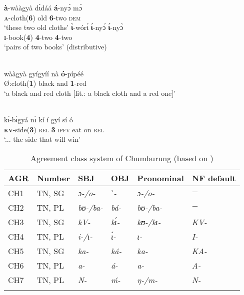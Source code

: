 \documentclass[output=collectionpaper]{langsci/langscibook}
\begin{document}
\ea
\label{ex:Gueld:7}
\begin{xlist}
\ex
\gll \textbf{à}{}-wààgyà   d\`{ɩ}dáá   \textbf{á}{}-ny\'{ɔ}   m\`{ɔ}\\
     \textbf{\textsc{a}}\textsc{{}-}cloth(\textbf{6})  old \textbf{\textsc{6}}\textsc{{}-}two \textsc{dem}\\
\glt `these two old cloths'
\ex
\gll \textbf{\`{ɩ}}{}-wór\'{ɩ}    \textbf{\'{ɩ}}{}-ny\'{ɔ}   \textbf{\'{ɩ}}{}-ny\`{ɔ}\\
     \textbf{\textsc{i}}{}-book(\textbf{4})  \textbf{4}{}-two  \textbf{4}{}-two\\
\glt `pairs of two books' (distributive)
\end{xlist}
\z

\ea
\label{ex:Gueld:8}
\\
\gll wààgyà   gyígyíí   nà   \textbf{ó}{}-pípéé\\
     Ø:cloth(\textbf{1})  black   and \textbf{\textsc{1}}{}-red\\
\glt `a black and red cloth [lit.: a black cloth and a red one]'
\z

\ea
\label{ex:Gueld:9}
\\
\gll k\`{ɩ}-b\'{ɩ}gyá  n\'{ɩ}   kí  í  gyí  sí  ó\\
     \textbf{\textsc{kv}}{}-side(\textbf{3})  \textsc{rel}  \textbf{3}  \textsc{ipfv}  eat  on  \textsc{rel}\\
\glt `... the side that will win'
\z

\begin{table}
\begin{tabularx}{\textwidth}{lXXXXX}
\lsptoprule
AGR & Number & SBJ & OBJ & Pronominal & NF default\\
\midrule
CH1 & TN, SG & \itshape ɔ{}-/o{}- & \itshape ˋ{}- & \itshape ɔ{}-/o{}- & $-$\\
CH2 & TN, PL & \itshape bʊ{}-/ba{}- & \itshape bá{}- & \itshape bʊ{}-/ba{}- & $-$\\
CH3 & TN, SG & \itshape kV{}- & \itshape k\'{ɩ}- & \itshape kʊ{}-/kɩ- & \itshape KV{}-\\
CH4 & TN, PL & \itshape i{}-/ɩ{}- & \itshape \'{ɩ}- & \itshape ɩ{}- & \itshape I{}-\\
CH5 & TN, SG & \itshape ka- & \itshape ká{}- & \itshape ka{}- & \itshape KA{}-\\
CH6 & TN, PL & \itshape a{}- & \itshape á{}- & \itshape a{}- & \itshape A{}-\\
CH7 & TN, PL & \itshape N- & \itshape ḿ{}- & \itshape ŋ{}-/m{}- & \itshape N{}-\\
\lspbottomrule
\end{tabularx}

\caption{Agreement class system of Chumburung (based on \citealt{Hansford1990})}
\label{tab:Gueld:7}
\end{table}
\end{document}

